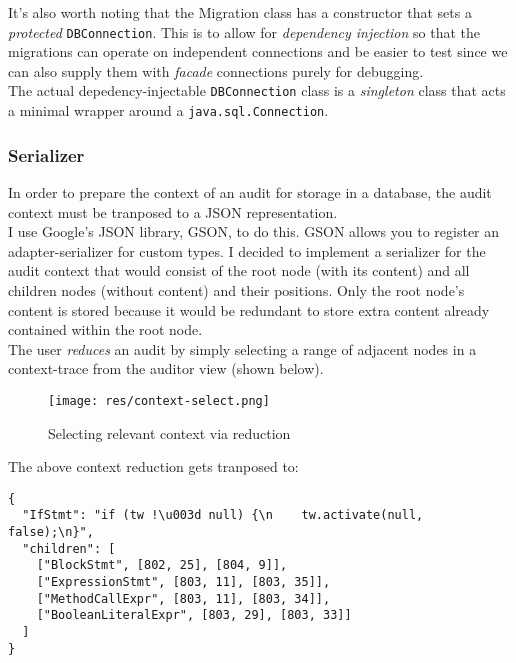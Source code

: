 \documentclass[9pt]{article}
\renewenvironment{framed}[1][\hsize]
   {\MakeFramed{\hsize#1\advance\hsize-\width \FrameRestore}}%
   {\endMakeFramed}
\begin{document}
			It's also worth noting that the Migration class has a constructor
			that sets a \textit{protected} \texttt{DBConnection}. This is to
			allow for \textit{dependency injection} so that the migrations can
			operate on independent connections and be easier to test since we
			can also supply them with \textit{facade} connections purely for
			debugging.\\

			The actual depedency-injectable \texttt{DBConnection} class is a
			\textit{singleton} class that acts a minimal wrapper around a
			\texttt{java.sql.Connection}.\\

		\subsubsection{Serializer}
			
			In order to prepare the context of an audit for storage in a
			database, the audit context must be tranposed to a JSON
			representation.\\

			I use Google's JSON library, GSON, to do this. GSON allows you to
			register an adapter-serializer for custom types. I decided to
			implement a serializer for the audit context that would consist of
			the root node (with its content) and all children nodes (without
			content) and their positions. Only the root node's content is stored
			because it would be redundant to store extra content already
			contained within the root node.\\

			The user \textit{reduces} an audit by simply selecting a range of
			adjacent nodes in a context-trace from the auditor view (shown
			below).\\

			\begin{figure}[H]
				\centering
				\texttt{[image: res/context-select.png]}
				\caption{Selecting relevant context via reduction}
			\end{figure}
			
			The above context reduction gets tranposed to:\\

			\begin{framed}[1.2\textwidth]
				\begin{verbatim}
{
  "IfStmt": "if (tw !\u003d null) {\n    tw.activate(null, false);\n}",
  "children": [
    ["BlockStmt", [802, 25], [804, 9]],
    ["ExpressionStmt", [803, 11], [803, 35]],
    ["MethodCallExpr", [803, 11], [803, 34]],
    ["BooleanLiteralExpr", [803, 29], [803, 33]]
  ]
}
				\end{verbatim}
			\end{framed}
\end{document}
